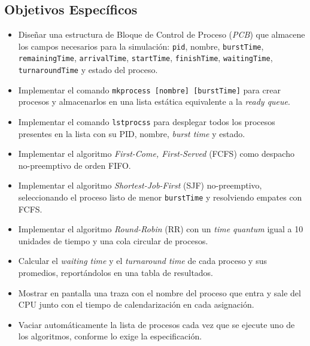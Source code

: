 \documentclass[12pt]{article}
\begin{document}
    \subsection{Objetivos Específicos}
        \begin{itemize}
            \item Diseñar una estructura de Bloque de Control de Proceso (\textit{PCB}) que almacene los campos necesarios para la simulación: \texttt{pid}, nombre, \texttt{burstTime}, \texttt{remainingTime}, \texttt{arrivalTime}, \texttt{startTime}, \texttt{finishTime}, \texttt{waitingTime}, \texttt{turnaroundTime} y estado del proceso.
            \item Implementar el comando \texttt{mkprocess [nombre] [burstTime]} para crear procesos y almacenarlos en una lista estática equivalente a la \textit{ready queue}.
            \item Implementar el comando \texttt{lstprocss} para desplegar todos los procesos presentes en la lista con su PID, nombre, \textit{burst time} y estado.
            \item Implementar el algoritmo \textit{First-Come, First-Served} (FCFS) como despacho no-preemptivo de orden FIFO.
            \item Implementar el algoritmo \textit{Shortest-Job-First} (SJF) no-preemptivo, seleccionando el proceso listo de menor \texttt{burstTime} y resolviendo empates con FCFS.
            \item Implementar el algoritmo \textit{Round-Robin} (RR) con un \textit{time quantum} igual a 10 unidades de tiempo y una cola circular de procesos.
            \item Calcular el \textit{waiting time} y el \textit{turnaround time} de cada proceso y sus promedios, reportándolos en una tabla de resultados.
            \item Mostrar en pantalla una traza con el nombre del proceso que entra y sale del CPU junto con el tiempo de calendarización en cada asignación.
            \item Vaciar automáticamente la lista de procesos cada vez que se ejecute uno de los algoritmos, conforme lo exige la especificación.
        \end{itemize}

\newpage
\end{document}
